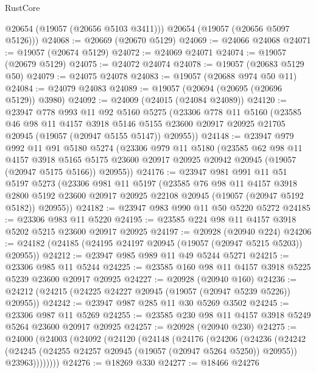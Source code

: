 \begin{lexlean}{RustCore}
\begin{coremodule}
        @20654
        (@19057 (@20656 @5103 @3411)))
      @20654
      (@19057 (@20656 @5097 @5126)))
@24068 := @20669 (@20670 @5129)
@24069 := @24066 @24068
@24071 := @19057 (@20674 @5129)
@24072 := @24069 @24071
@24074 := @19057 (@20679 @5129)
@24075 := @24072 @24074
@24078 := @19057 (@20683 @5129 @50)
@24079 := @24075 @24078
@24083 := @19057 (@20688 @974 @50 @11)
@24084 := @24079 @24083
@24089 := @19057 (@20694 (@20695 (@20696 @5129)) @3980)
@24092 := @24009 (@24015 (@24084 @24089))
@24120 := @23947
    @778
    @993
    @11
    @92
    @5160
    @5275
    (@23306
      @778
      @11
      @5160
      (@23585
        @46
        @98
        @11
        @4157
        @3918
        @5146
        @5155
        @23600
        @20917
        @20925
        @21705
        @20945
        (@19057 (@20947 @5155 @5147))
        @20955))
@24148 := @23947
    @979
    @992
    @11
    @91
    @5180
    @5274
    (@23306
      @979
      @11
      @5180
      (@23585
        @62
        @98
        @11
        @4157
        @3918
        @5165
        @5175
        @23600
        @20917
        @20925
        @20942
        @20945
        (@19057 (@20947 @5175 @5166))
        @20955))
@24176 := @23947
    @981
    @991
    @11
    @51
    @5197
    @5273
    (@23306
      @981
      @11
      @5197
      (@23585
        @76
        @98
        @11
        @4157
        @3918
        @2800
        @5192
        @23600
        @20917
        @20925
        @22108
        @20945
        (@19057 (@20947 @5192 @5182))
        @20955))
@24182 := @23947 @983 @990 @11 @50 @5220 @5272
@24185 := @23306 @983 @11 @5220
@24195 := @23585 @224 @98 @11 @4157 @3918 @5202 @5215 @23600 @20917 @20925
@24197 := @20928 (@20940 @224)
@24206 := @24182 (@24185 (@24195 @24197 @20945 (@19057 (@20947 @5215 @5203)) @20955))
@24212 := @23947 @985 @989 @11 @49 @5244 @5271
@24215 := @23306 @985 @11 @5244
@24225 := @23585 @160 @98 @11 @4157 @3918 @5225 @5239 @23600 @20917 @20925
@24227 := @20928 (@20940 @160)
@24236 := @24212 (@24215 (@24225 @24227 @20945 (@19057 (@20947 @5239 @5226)) @20955))
@24242 := @23947 @987 @285 @11 @30 @5269 @3502
@24245 := @23306 @987 @11 @5269
@24255 := @23585 @230 @98 @11 @4157 @3918 @5249 @5264 @23600 @20917 @20925
@24257 := @20928 (@20940 @230)
@24275 := @24000
    (@24003
      (@24092
        (@24120
          (@24148
            (@24176
              (@24206
                (@24236
                  (@24242
                    (@24245 (@24255 @24257 @20945 (@19057 (@20947 @5264 @5250)) @20955))
                    @23963))))))))
@24276 := @18269 @330
@24277 := @18466 @24276

\end{coremodule}
\end{lexlean}
